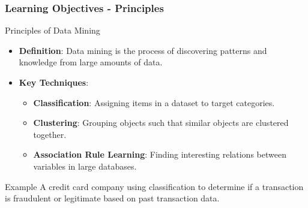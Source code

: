 \documentclass[aspectratio=169]{beamer}
\begin{document}
\begin{frame}[fragile]
    \frametitle{Learning Objectives - Principles}
    \begin{block}{Principles of Data Mining}
        \begin{itemize}
            \item \textbf{Definition}: Data mining is the process of discovering patterns and knowledge from large amounts of data.
            \item \textbf{Key Techniques}:
            \begin{itemize}
                \item \textbf{Classification}: Assigning items in a dataset to target categories.
                \item \textbf{Clustering}: Grouping objects such that similar objects are clustered together.
                \item \textbf{Association Rule Learning}: Finding interesting relations between variables in large databases.
            \end{itemize}
        \end{itemize}
    \end{block}
    \begin{block}{Example}
        A credit card company using classification to determine if a transaction is fraudulent or legitimate based on past transaction data.
    \end{block}
\end{frame}
\end{document}
